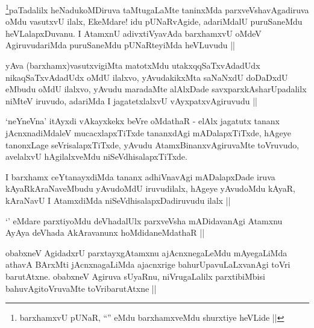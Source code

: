 \begin{artha}
\footnote[1]{barxhamxvU pUNaR, ``\stext'' eMdu barxhamxveMdu shurxtiye
heVLide ||}paTadalilx heNadukoMDiruva taMtugaLaMte taninxMda parxveVshavAgadiruva
oMdu vasutxvU ilalx, EkeMdare! idu pUNaRvAgide, adariMdalU puruSaneMdu
heVLalapxDuvanu. I AtamxnU adivxtiVyavAda barxhamxvU oMdeV
AgiruvudariMda puruSaneMdu pUNaRteyiMda heVLuvudu ||
\end{artha}


\begin{artha}
yAva (barxhamx)vasutxvigiMta matotxMdu utakxqqSaTxvAdadUdx
nikaqSaTxvAdadUdx oMdU ilalxvo, yAvudakikxMta saNaNxdU doDaDxdU eMbudu
oMdU ilalxvo, yAvudu maradaMte alAlxDade savxparxkAsharUpadalilx
niMteV iruvudo, adariMda I jagatetxlalxvU vAyxpatxvAgiruvudu ||
\end{artha}

\begin{artha}
`neYneVna' itAyxdi vAkayxkekx beVre oMdathaR - elAlx jagatutx tananx
  jAcnxnadiMdaleV mucacxlapxTiTxde tananxdAgi mADalapxTiTxde, hAgeye
  tanonxLage seVrisalapxTiTxde, yAvudu AtamxBinanxvAgiruvaMte
  toVruvudo, avelalxvU hAgilalxveMdu niSeVdhisalapxTiTxde.
\end{artha}

\begin{artha}
I barxhamx ceYtanayxdiMda tananx adhiVnavAgi mADalapxDade iruva
kAyaRkAraNaveMbudu yAvudoMdU iruvudilalx, hAgeye yAvudoMdu kAyaR,
kAraNavU I AtamxdiMda niSeVdhisalapxDadiruvudu ilalx ||
\end{artha}


\begin{artha}
`\stext' eMdare parxtiyoMdu deVhadalUlx parxveVsha mADidavanAgi
  Atamxnu AyAya deVhada AkAravanunx hoMdidaneMdathaR ||
\end{artha}


\begin{artha}
obabxneV AgidadxrU parxtayxgAtamxnu ajAcnxnegaLeMdu mAyegaLiMda athavA
BArxMti jAcnxnagaLiMda ajacnxrige bahurUpavuLaLxvanAgi toVri
barutAtxne. obabxneV Agiruva sUyaRnu, niVrugaLalilx  parxtibiMbisi
bahuvAgitoVruvaMte toVribarutAtxne ||
\end{artha}

